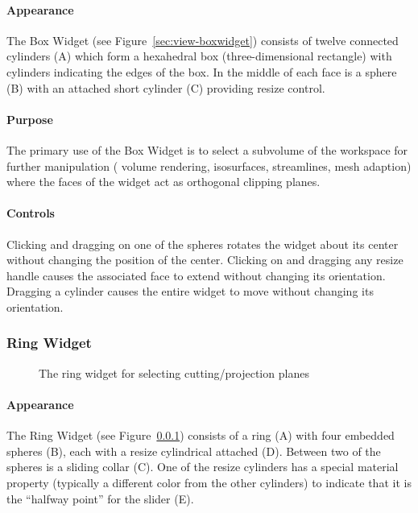 \paragraph{Appearance} The Box
Widget (see Figure~\ref{sec:view-boxwidget}) consists of twelve 
connected cylinders (A) which form a hexahedral box (three-dimensional
rectangle) with cylinders indicating the edges of the box.  In the
middle of each face is a sphere (B) with an attached short cylinder
(C) providing resize control.

\paragraph{Purpose} The primary use of the Box Widget is to select a
subvolume of the workspace for further manipulation (\eg{} volume
rendering, isosurfaces, streamlines, mesh adaption) where the faces of the
widget act as orthogonal clipping planes.

\paragraph{Controls} Clicking and dragging on one of the spheres rotates
the widget about its center without changing the position of the center.
Clicking on and dragging any resize handle
causes the associated face to extend without changing its orientation.
Dragging a cylinder causes the entire widget to move without changing its
orientation.

\subsubsection{Ring Widget}
\label{sec:view-ringwidget} 

\begin{figure}[htb]
  \begin{makeimage}
  \end{makeimage}
  \ringwidget
  \caption{\label{fig:ringwidget} The ring widget for selecting
    cutting/projection planes}
\end{figure}


\paragraph{Appearance} The Ring
Widget (see Figure~\ref{sec:view-ringwidget}) consists of a ring (A)
with four embedded spheres (B), each with a resize cylindrical
attached (D).  Between two of the spheres is a sliding collar (C).
One of the resize cylinders has a special material property (typically
a different color from the other cylinders) to indicate that it is the
``halfway point'' for the slider (E).

